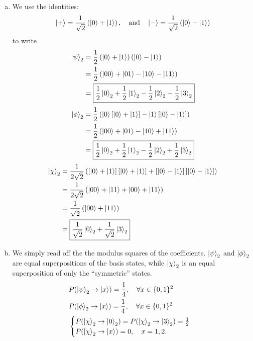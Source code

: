 \documentclass{book}
\theoremstyle{definition}
\newcommand{\nn}{\nonumber}
\newcommand{\f}[2]{\frac{#1}{#2}}
\newcommand{\lp}{\left(}
\newcommand{\rp}{\right)}
\newcommand{\lb}{\left[}
\newcommand{\rb}{\right]}
\begin{document}
\begin{enumerate}[(a)]
	\item We use the identities:
	\begin{align}
	\ket{+} = \f{1}{\sqrt{2}}\lp \ket{0} + \ket{1} \rp, \quad \text{and} \quad \ket{-} = \f{1}{\sqrt{2}}\lp \ket{0} - \ket{1} \rp
	\end{align}
	to write
	\begin{align}
	\ket{\psi}_2 
	&= \f{1}{2}\lp \ket{0} + \ket{1}  \rp\lp \ket{0} - \ket{1}  \rp\nn\\
	&= \f{1}{2}\lp \ket{00} + \ket{01} - \ket{10}- \ket{11} \rp\nn\\
	&= \boxed{\f{1}{2}\ket{0}_2 + \f{1}{2}\ket{1}_2 - \f{1}{2}\ket{2}_2 - \f{1}{2}\ket{3}_2}
	\end{align}
	\begin{align}
	\ket{\phi}_2 
	&= \f{1}{2}\lp \ket{0}\lb \ket{0} + \ket{1} \rb - \ket{1}\lb \ket{0} - \ket{1} \rb \rp\nn\\
	&= \f{1}{2}\lp \ket{00} + \ket{01} - \ket{10} + \ket{11} \rp\nn\\
	&= \boxed{\f{1}{2}\ket{0}_2 + \f{1}{2}\ket{1}_2 - \f{1}{2}\ket{2}_2 + \f{1}{2}\ket{3}_2}
	\end{align}
	\begin{align}
	\ket{\chi}_2 
	&= \f{1}{2\sqrt{2}}\lp \lb \ket{0} + \ket{1} \rb \lb \ket{0} + \ket{1} \rb + \lb \ket{0} - \ket{1} \rb \lb \ket{0} - \ket{1} \rb  \rp\nn\\
	&= \f{1}{2\sqrt{2}}\lp  \ket{00} + \ket{11} + \ket{00} + \ket{11} \rp\nn\\
	&= \f{1}{\sqrt{2}}\lp \ket{00} + \ket{11} \rp\nn\\
	&= \boxed{\f{1}{\sqrt{2}} \ket{0}_2    + \f{1}{\sqrt{2}} \ket{3}_2 }
	\end{align}
	
	
	\item We simply read off the the modulus squares of the coefficients. $\ket{\psi}_2$ and $\ket{\phi}_2$ are equal superpositions of the basis states, while $\ket{\chi}_2$ is an equal superposition of only the ``symmetric'' states.  
	\begin{align}
	&P(\ket{\psi}_2 \to \ket{x}) = \f{1}{4}, \quad \forall x \in \{0,1\}^2\\
	&P(\ket{\phi}_2 \to \ket{x}) = \f{1}{4}, \quad \forall x \in \{0,1\}^2	\\
	&\begin{cases}
	P(\ket{\chi}_2 \to \ket{0}_2) = P(\ket{\chi}_2 \to \ket{3}_2) = \f{1}{2}\\ 
	P(\ket{\chi}_2 \to \ket{x}) = 0, \quad x=1,2.
	\end{cases}
	\end{align}
	

\end{enumerate}
\end{document}

